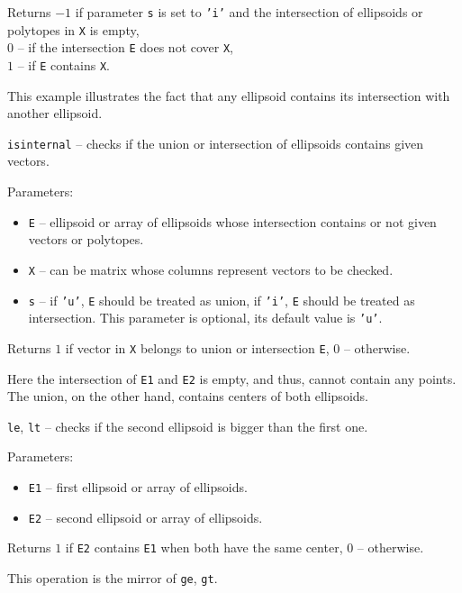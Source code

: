 Returns $-1$ if parameter {\tt s} is set to {\tt 'i'} and the intersection
of ellipsoids or polytopes in {\tt X} is empty,\\
$0$ -- if the intersection {\tt E} does not cover {\tt X},\\
$1$ -- if {\tt E} contains {\tt X}.


This example illustrates the fact that any ellipsoid contains its intersection with
another ellipsoid.

\newpage

{\Large {\tt isinternal}} -- checks if the union or intersection of ellipsoids
contains given vectors.

Parameters:
\begin{itemize}
\item {\tt E} -- ellipsoid or array of ellipsoids whose intersection contains
or not given vectors or polytopes.
\item {\tt X} -- can be matrix whose columns represent vectors to be checked.
\item {\tt s} -- if {\tt 'u'}, {\tt E} should be treated as union,
if {\tt 'i'}, {\tt E} should be treated as intersection. This parameter
is optional, its default value is {\tt 'u'}.
\end{itemize}

Returns $1$ if vector in {\tt X} belongs to union or intersection {\tt E},
$0$ -- otherwise.



Here the intersection of {\tt E1} and {\tt E2} is empty, and thus, cannot
contain any points. The union, on the other hand, contains centers
of both ellipsoids.

\newpage

{\Large {\tt le}}, {\Large {\tt lt}} -- checks if the second ellipsoid is bigger
than the first one.

Parameters:
\begin{itemize}
\item {\tt E1} -- first ellipsoid or array of ellipsoids.
\item {\tt E2} -- second ellipsoid or array of ellipsoids.
\end{itemize}

Returns $1$ if {\tt E2} contains {\tt E1} when both have the same center,
$0$ -- otherwise.

This operation is the mirror of {\tt ge}, {\tt gt}.

